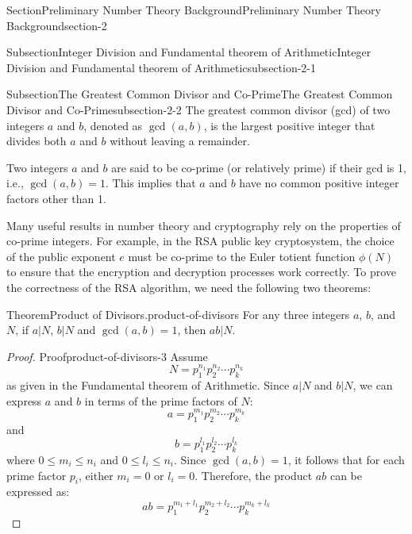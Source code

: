 \documentclass[oneside,12pt,]{article}
\numberwithin{equation}{section}
\begin{document}
\begin{sectionptx}{Section}{Preliminary Number Theory Background}{}{Preliminary Number Theory Background}{}{}{section-2}
\begin{subsectionptx}{Subsection}{Integer Division and Fundamental theorem of Arithmetic}{}{Integer Division and Fundamental theorem of Arithmetic}{}{}{subsection-2-1}
\end{subsectionptx}
%
%
\typeout{************************************************}
\typeout{************************************************}
%
\begin{subsectionptx}{Subsection}{The Greatest Common Divisor and Co-Prime}{}{The Greatest Common Divisor and Co-Prime}{}{}{subsection-2-2}
The greatest common divisor (gcd) of two integers \(a\) and \(b\), denoted as \(\gcd(a, b)\), is the largest positive integer that divides both \(a\) and \(b\) without leaving a remainder.%
\par
Two integers \(a\) and \(b\) are said to be co-prime (or relatively prime) if their gcd is 1, i.e., \(\gcd(a, b) = 1\). This implies that \(a\) and \(b\) have no common positive integer factors other than 1.%
\par
Many useful results in number theory and cryptography rely on the properties of co-prime integers. For example, in the RSA public key cryptosystem, the choice of the public exponent \(e\) must be co-prime to the Euler totient function \(\phi(N)\) to ensure that the encryption and decryption processes work correctly. To prove the correctness of the RSA algorithm, we need the following two theorems:%
\begin{theorem}{Theorem}{Product of Divisors.}{}{product-of-divisors}%
For any three integers \(a\), \(b\), and \(N\), if \(a|N\), \(b|N\) and \(\gcd(a, b) = 1\), then \(ab|N\).%
\end{theorem}
\begin{proof}{Proof}{}{product-of-divisors-3}
Assume%
\begin{equation*}
N = p_1^{n_1} p_2^{n_2} \cdots p_k^{n_k}
\end{equation*}
as given in the Fundamental theorem of Arithmetic. Since \(a|N\) and \(b|N\), we can express \(a\) and \(b\) in terms of the prime factors of \(N\):%
\begin{equation*}
a = p_1^{m_1} p_2^{m_2} \cdots p_k^{m_k}
\end{equation*}
and%
\begin{equation*}
b = p_1^{l_1} p_2^{l_2} \cdots p_k^{l_k}
\end{equation*}
where \(0 \leq m_i \leq n_i\) and \(0 \leq l_i \leq n_i\). Since \(\gcd(a, b) = 1\), it follows that for each prime factor \(p_i\), either \(m_i = 0\) or \(l_i = 0\). Therefore, the product \(ab\) can be expressed as:%
\begin{equation*}
ab = p_1^{m_1 + l_1} p_2^{m_2 + l_2} \cdots p_k^{m_k + l_k}

\end{equation*}
\end{proof}
\end{subsectionptx}
\end{sectionptx}
\end{document}
